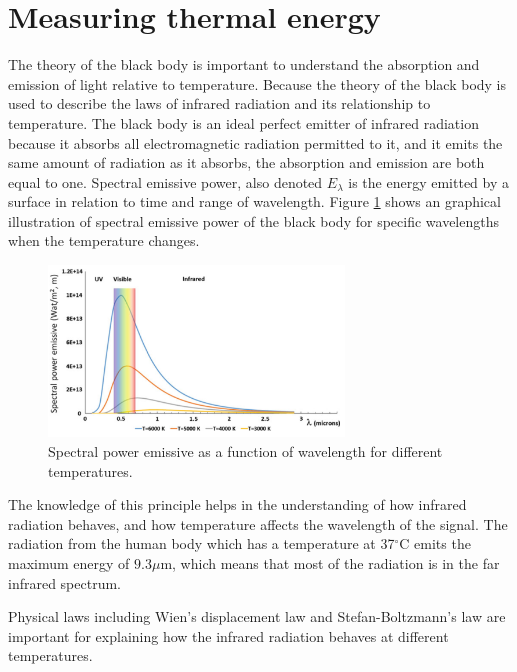 \section{Measuring thermal energy}

The theory of the black body is important to understand the absorption and emission of light relative to temperature. Because the theory of the black body is used to describe the laws of infrared radiation and its relationship to temperature. The black body is an ideal perfect emitter of infrared radiation because it absorbs all electromagnetic radiation permitted to it, and it emits the same amount of radiation as it absorbs, the absorption and emission are both equal to one. 
Spectral emissive power, also denoted $E_\lambda$ is the energy emitted by a surface in relation to time and range of wavelength. Figure \ref{fig:Spectral} shows an graphical illustration of spectral emissive power of the black body for specific wavelengths when the temperature changes. \cite{ignacio2017} 

\begin{figure}[H]
	\centering	\includegraphics[width=0.7\textwidth]{figures/Spectral_power_emissive}
	\caption{Spectral power emissive as a function of wavelength for different temperatures.\cite{ignacio2017}}
	\label{fig:Spectral}
\end{figure} \vspace{-.3cm}

The knowledge of this principle helps in the understanding of how infrared radiation behaves, and how temperature affects the wavelength of the signal. 
The radiation from the human body which has a temperature at 37$^{\circ}$C emits the maximum energy of $9.3 \mu$m, which means that most of the radiation is in the far infrared spectrum.\cite{ignacio2017}

Physical laws including Wien's displacement law and Stefan-Boltzmann's law are important for explaining how the infrared radiation behaves at different temperatures. \cite{ignacio2017} 

